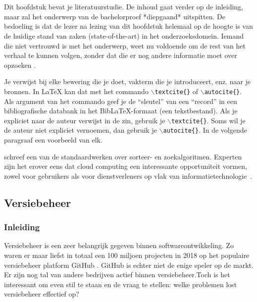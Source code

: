 \chapter{}
\label{ch:stand-van-zaken}
\graphicspath{{../../Images/}} 


Dit hoofdstuk bevat je literatuurstudie. De inhoud gaat verder op de inleiding, maar zal het onderwerp van de bachelorproef *diepgaand* uitspitten. De bedoeling is dat de lezer na lezing van dit hoofdstuk helemaal op de hoogte is van de huidige stand van zaken (state-of-the-art) in het onderzoeksdomein. Iemand die niet vertrouwd is met het onderwerp, weet nu voldoende om de rest van het verhaal te kunnen volgen, zonder dat die er nog andere informatie moet over opzoeken \autocite{Pollefliet2011}.

Je verwijst bij elke bewering die je doet, vakterm die je introduceert, enz. naar je bronnen. In \LaTeX{} kan dat met het commando \texttt{$\backslash${textcite\{\}}} of \texttt{$\backslash${autocite\{\}}}. Als argument van het commando geef je de ``sleutel'' van een ``record'' in een bibliografische databank in het Bib\LaTeX{}-formaat (een tekstbestand). Als je expliciet naar de auteur verwijst in de zin, gebruik je \texttt{$\backslash${}textcite\{\}}.
Soms wil je de auteur niet expliciet vernoemen, dan gebruik je \texttt{$\backslash${}autocite\{\}}. In de volgende paragraaf een voorbeeld van elk.

\textcite{Knuth1998} schreef een van de standaardwerken over sorteer- en zoekalgoritmen. Experten zijn het erover eens dat cloud computing een interessante opportuniteit vormen, zowel voor gebruikers als voor dienstverleners op vlak van informatietechnologie~\autocite{Creeger2009}.
\newpage
\section{Versiebeheer}
\subsection{Inleiding}
Versiebeheer is een zeer belangrijk gegeven binnen softwareontwikkeling. Zo waren er maar liefst in totaal een 100 miljoen projecten in 2018 op het populaire versiebeheer platform GitHub \autocite{Git2018}. GitHub is echter niet de enige speler op de markt. Er zijn nog tal van andere bedrijven actief binnen versiebeheer.Toch is het interessant om even stil te staan en de vraag te stellen: welke problemen lost versiebeheer effectief op?

